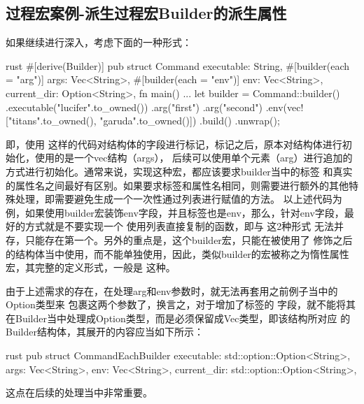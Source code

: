 \subsection{过程宏案例-派生过程宏Builder的派生属性}
如果继续进行深入，考虑下面的一种形式：
\begin{code-block}{rust}
#[derive(Builder)]
pub struct Command {
    executable: String,
    #[builder(each = "arg")]
    args: Vec<String>,
    #[builder(each = "env")]
    env: Vec<String>,
    current_dir: Option<String>,
}
fn main() {
    ...
    let builder = Command::builder()
        .executable("lucifer".to_owned())
        .arg("first")
        .arg("second")
        .env(vec!["titans".to_owned(), "garuda".to_owned()])
        .build()
        .unwrap();
}
\end{code-block}
即，使用
这样的代码对结构体的字段进行标记，标记之后，原本对结构体进行初始化，使用的是一个vec结构（args），
后续可以使用单个元素（arg）进行追加的方式进行初始化。通常来说，实现这种宏，都应该要求builder当中的标签
和真实的属性名之间最好有区别。如果要求标签和属性名相同，则需要进行额外的其他特殊处理，即需要避免生成一个一次性通过列表进行赋值的方法。
以上述代码为例，如果使用builder宏装饰env字段，并且标签也是env，那么，针对env字段，最好的方式就是不要实现一个
使用列表直接复制的函数，即与
这2种形式
无法并存，只能存在第一个。另外的重点是，这个builder宏，只能在被使用了
修饰之后的结构体当中使用，而不能单独使用，因此，类似builder的宏被称之为惰性属性
宏，其完整的定义形式，一般是
这种。

由于上述需求的存在，在处理arg和env参数时，就无法再套用之前例子当中的Option类型来
包裹这两个参数了，换言之，对于增加了标签的
字段，就不能将其在Builder当中处理成Option类型，而是必须保留成Vec类型，即该结构所对应
的Builder结构体，其展开的内容应当如下所示：
\begin{code-block}{rust}
pub struct CommandEachBuilder {
    executable: std::option::Option<String>,
    args: Vec<String>,
    env: Vec<String>,
    current_dir: std::option::Option<String>,
}
\end{code-block}
这点在后续的处理当中非常重要。

